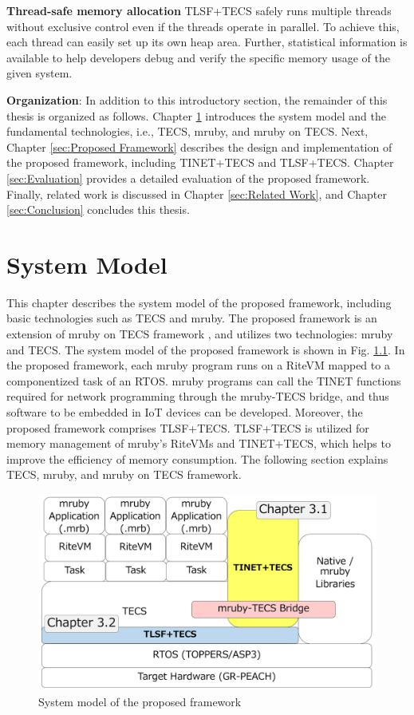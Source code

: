 \documentclass[a4j,12pt,oneside,openany,english]{jsbook}
\begin{document}
{\bf Thread-safe memory allocation}
TLSF+TECS safely runs multiple threads without exclusive control even if the threads operate in parallel.
To achieve this, each thread can easily set up its own heap area.
Further, statistical information is available to help developers debug and verify the specific memory usage of the given system.

{\bf Organization}: In addition to this introductory section, the remainder of this thesis is organized as follows.
Chapter \ref{sec:System Model} introduces the system model and the fundamental technologies, i.e., TECS, mruby, and mruby on TECS.
Next, Chapter \ref{sec:Proposed Framework} describes the design and implementation of the proposed framework, including TINET+TECS and TLSF+TECS.
Chapter \ref{sec:Evaluation} provides a detailed evaluation of the proposed framework.
Finally, related work is discussed in Chapter \ref{sec:Related Work}, and Chapter \ref{sec:Conclusion} concludes this thesis.


\chapter{System Model}
\label{sec:System Model}

This chapter describes the system model of the proposed framework, including basic technologies such as TECS and mruby.
The proposed framework is an extension of mruby on TECS framework \cite{par:mrubyonTECS}\cite{par:mrubyonTECS3}, and utilizes two technologies: mruby and TECS.
The system model of the proposed framework is shown in Fig. \ref{fig:SystemModel}.
In the proposed framework, each mruby program runs on a RiteVM mapped to a componentized task of an RTOS.
mruby programs can call the TINET functions required for network programming through the mruby-TECS bridge, and thus software to be embedded in IoT devices can be developed.
Moreover, the proposed framework comprises TLSF+TECS.
TLSF+TECS is utilized for memory management of mruby's RiteVMs and TINET+TECS, which helps to improve the efficiency of memory consumption.
The following section explains TECS, mruby, and mruby on TECS framework.


\begin{figure}[t]
    \centering
    \includegraphics[width=12cm,clip]{figure/SystemModel.pdf}
    \caption{System model of the proposed framework}
    \label{fig:SystemModel}
\end{figure}
\end{document}
